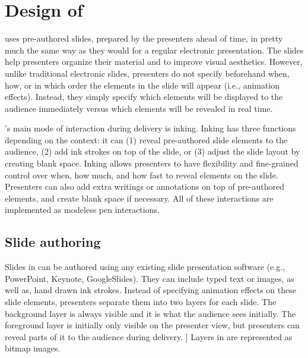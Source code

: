 \section{Design of \interface}

\interface uses pre-authored slides, prepared by the presenters ahead of time, in pretty much the same way as they would for a regular electronic presentation. The slides help presenters organize their material and to improve visual aesthetics. However, unlike traditional electronic slides, presenters do not specify beforehand when, how, or in which order the elements in the slide will appear (i.e., animation effects). Instead, they simply specify which elements will be displayed to the audience immediately versus which elements will be revealed in real time. 

\interface's main mode of interaction during delivery is inking. Inking has three functions depending on the context: it can (1) reveal pre-authored slide elements to the audience, (2) add ink strokes on top of the slide, or (3) adjust the slide layout by creating blank space. Inking allows presenters to have flexibility and fine-grained control over when, how much, and how fast to reveal elements on the slide. Presenters can also add extra writings or annotations on top of pre-authored elements, and create blank space if necessary. All of these interactions are implemented as modeless pen interactions. 
 
\subsection{Slide authoring}
Slides in \interface can be authored using any existing slide presentation software (e.g., PowerPoint, Keynote, GoogleSlides). They can include typed text or images, as well as, hand drawn ink strokes. Instead of specifying animation effects on these slide elements, presenters separate them into two layers for each slide. The background layer is always visible and it is what the audience sees initially. The foreground layer is initially only visible on the presenter view, but presenters can reveal parts of it to the audience during delivery. ] Layers in \interface are represented as bitmap images. 

